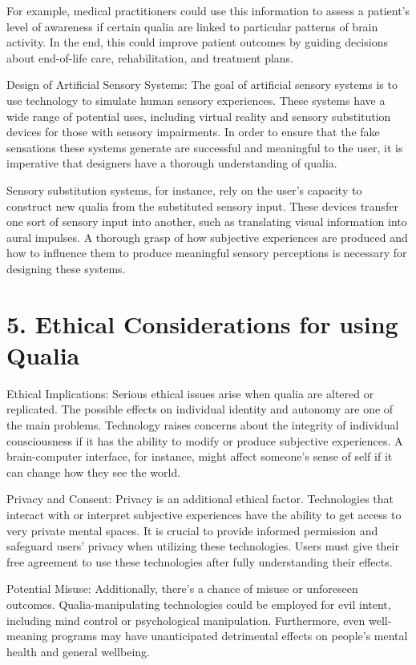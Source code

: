 \documentclass{article}
\begin{document}
For example, medical practitioners could use this information to assess a patient's level of awareness if certain qualia are linked to particular patterns of brain activity. In the end, this could improve patient outcomes by guiding decisions about end-of-life care, rehabilitation, and treatment plans.


Design of Artificial Sensory Systems:
The goal of artificial sensory systems is to use technology to simulate human sensory experiences. These systems have a wide range of potential uses, including virtual reality and sensory substitution devices for those with sensory impairments. In order to ensure that the fake sensations these systems generate are successful and meaningful to the user, it is imperative that designers have a thorough understanding of qualia.

Sensory substitution systems, for instance, rely on the user's capacity to construct new qualia from the substituted sensory input. These devices transfer one sort of sensory input into another, such as translating visual information into aural impulses. A thorough grasp of how subjective experiences are produced and how to influence them to produce meaningful sensory perceptions is necessary for designing these systems.


\section*{5. Ethical Considerations for using Qualia}

Ethical Implications:
Serious ethical issues arise when qualia are altered or replicated. The possible effects on individual identity and autonomy are one of the main problems. Technology raises concerns about the integrity of individual consciousness if it has the ability to modify or produce subjective experiences. A brain-computer interface, for instance, might affect someone's sense of self if it can change how they see the world.

Privacy and Consent:
Privacy is an additional ethical factor. Technologies that interact with or interpret subjective experiences have the ability to get access to very private mental spaces. It is crucial to provide informed permission and safeguard users' privacy when utilizing these technologies. Users must give their free agreement to use these technologies after fully understanding their effects.

Potential Misuse:
Additionally, there's a chance of misuse or unforeseen outcomes. Qualia-manipulating technologies could be employed for evil intent, including mind control or psychological manipulation. Furthermore, even well-meaning programs may have unanticipated detrimental effects on people's mental health and general wellbeing.
\end{document}
